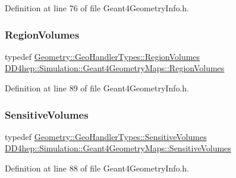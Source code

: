 Definition at line 76 of file Geant4\+Geometry\+Info.\+h.

\hypertarget{namespace_d_d4hep_1_1_simulation_1_1_geant4_geometry_maps_a9fc457ad93d6235197e7e1ab013d1f56}{}\label{namespace_d_d4hep_1_1_simulation_1_1_geant4_geometry_maps_a9fc457ad93d6235197e7e1ab013d1f56} 
\subsubsection{\texorpdfstring{Region\+Volumes}{RegionVolumes}}
{\footnotesize\ttfamily typedef \hyperlink{class_d_d4hep_1_1_geometry_1_1_geo_handler_types_a8e121c3a06f16781bbabba4528136654}{Geometry\+::\+Geo\+Handler\+Types\+::\+Region\+Volumes} \hyperlink{namespace_d_d4hep_1_1_simulation_1_1_geant4_geometry_maps_a9fc457ad93d6235197e7e1ab013d1f56}{D\+D4hep\+::\+Simulation\+::\+Geant4\+Geometry\+Maps\+::\+Region\+Volumes}}



Definition at line 89 of file Geant4\+Geometry\+Info.\+h.

\hypertarget{namespace_d_d4hep_1_1_simulation_1_1_geant4_geometry_maps_a4b4bd41ff250c41737c7a73223fab910}{}\label{namespace_d_d4hep_1_1_simulation_1_1_geant4_geometry_maps_a4b4bd41ff250c41737c7a73223fab910} 
\subsubsection{\texorpdfstring{Sensitive\+Volumes}{SensitiveVolumes}}
{\footnotesize\ttfamily typedef \hyperlink{class_d_d4hep_1_1_geometry_1_1_geo_handler_types_a530cdc551e68a5f975fe294329d27e63}{Geometry\+::\+Geo\+Handler\+Types\+::\+Sensitive\+Volumes} \hyperlink{namespace_d_d4hep_1_1_simulation_1_1_geant4_geometry_maps_a4b4bd41ff250c41737c7a73223fab910}{D\+D4hep\+::\+Simulation\+::\+Geant4\+Geometry\+Maps\+::\+Sensitive\+Volumes}}



Definition at line 88 of file Geant4\+Geometry\+Info.\+h.

